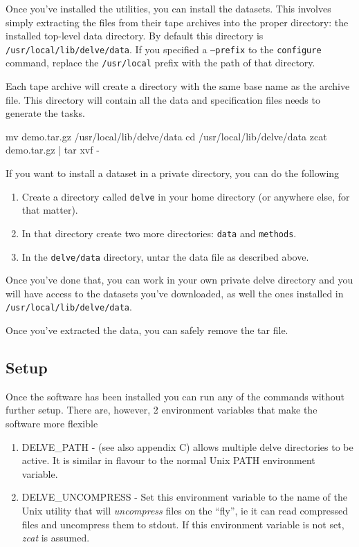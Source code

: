 Once you've installed the utilities, you can install the
datasets. This involves simply extracting the files from their tape
archives into the proper directory: the installed top-level \delve{}
data directory. By default this directory is
\texttt{/usr/local/lib/delve/data}. If you specified a
\texttt{--prefix} to the \texttt{configure} command, replace the
\texttt{/usr/local} prefix with the path of that directory.

Each tape archive will create a directory with the same base name as
the archive file. This directory will contain all the data and
specification files \delve{} needs to generate the tasks.
\begin{Session}
mv demo.tar.gz /usr/local/lib/delve/data
cd /usr/local/lib/delve/data
zcat demo.tar.gz | tar xvf -
\end{Session}

If you want to install a dataset in a private directory, you can do
the following
\begin{enumerate}
\item
Create a directory called \texttt{delve} in your home directory (or
anywhere else, for that matter).
\item
In that directory create two more directories: \texttt{data} and
\texttt{methods}.
\item
In the \texttt{delve/data} directory, untar the data file as described
above.
\end{enumerate}
Once you've done that, you can work in your own private delve
directory and you will have access to the datasets you've downloaded,
as well the ones installed in \texttt{/usr/local/lib/delve/data}.

Once you've extracted the data, you can safely remove the tar file.

\subsection*{Setup}

Once the software has been installed you can run any of the \delve{} commands
without further setup. There are, however, 2 environment variables that make the
software more flexible

\begin{enumerate}
\item
DELVE\_PATH - (see also appendix C) allows multiple delve directories to be
active. It is similar in flavour to the normal Unix PATH environment variable.

\item
DELVE\_UNCOMPRESS - Set this environment variable to the name of the Unix
utility that will {\em uncompress} files on the ``fly'', ie it can read
compressed files and uncompress them to stdout. If this environment variable
is not set, {\em zcat} is assumed.
\end{enumerate}
